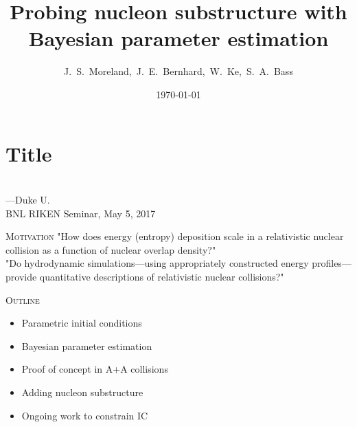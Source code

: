 \documentclass{beamer}
\title[Nucleon substructure]{Probing nucleon substructure with Bayesian parameter estimation}
\author[J.\ S.\ Moreland]{J.\ S.\ Moreland,\, J.\ E.\ Bernhard,\, W.\ Ke,\, S.\ A.\ Bass}
\institute[Duke U.]{Duke Univerity}
\date{\today}
\begin{document}
\section{Title}



\begin{frame}
  \centering \vspace{.2\textheight}
  {\color{theme}\Large\rm\inserttitle} \\[.04\textheight]
  {\normalsize \insertauthor---Duke U.} \\
  {\normalsize BNL RIKEN Seminar, May 5, 2017}
\end{frame}

\usebackgroundtemplate{}

\begin{frame}{\scshape Motivation}
  "How does energy (entropy) deposition scale in a relativistic nuclear collision as a function of nuclear overlap density?" \\[0.1\textheight]

  "Do hydrodynamic simulations---using appropriately constructed energy profiles---provide quantitative descriptions of relativistic nuclear collisions?"
\end{frame}

\begin{frame}{\scshape Outline}
  \begin{itemize}
    \item Parametric initial conditions \\[3ex]
    \item Bayesian parameter estimation \\[3ex]
    \item Proof of concept in A+A collisions \\[3ex]
    \item Adding nucleon substructure \\[3ex]
    \item Ongoing work to constrain IC
  \end{itemize} 
\end{frame}
\end{document}
